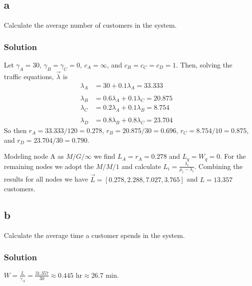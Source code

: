 \documentclass[letterpaper]{amsart}
\begin{document}
\subsection*{a}
Calculate the average number of customers in the system.
\subsubsection*{Solution}
Let $\gamma_A=30$, $\gamma_B=\gamma_C=0$, $c_A = \infty$,
and $c_B=c_C=c_D=1$.
Then, solving the traffic equations, $\vec{\lambda}$ is
\begin{align*}
  \lambda_A &= 30 + 0.1\lambda_A = 33.333 \\ \\
  \lambda_B &= 0.6\lambda_A + 0.1\lambda_C=20.875 \\
  \lambda_C &= 0.2\lambda_A + 0.1\lambda_B=8.754 \\ \\
  \lambda_D &= 0.8\lambda_B + 0.8\lambda_C= 23.704
\end{align*}
So then $r_A= 33.333/120 = 0.278$,
$r_B= 20.875/30=0.696$,
$r_C= 8.754/10=0.875$,
and $r_D= 23.704/30=0.790$.

Modeling node A as $M/G/\infty$ we find $L_A=r_A=0.278$ and $L_q=W_q=0$.
For the remaining nodes we adopt the $M/M/1$ and calculate
$L_i=\frac{\lambda_i}{\mu_i-\lambda_i}$. Combining the results for all nodes we have
$\vec{L}=[0.278, 2.288, 7.027, 3.765]$ and
$L = 13.357$ customers.
\subsection*{b}
Calculate the average time a customer spends in the system.
\subsubsection*{Solution}
$W=\frac{L}{\gamma_A}=\frac{31.357}{30}\approx 0.445\text{ hr}\approx 26.7\text{ min}$.
\end{document}
